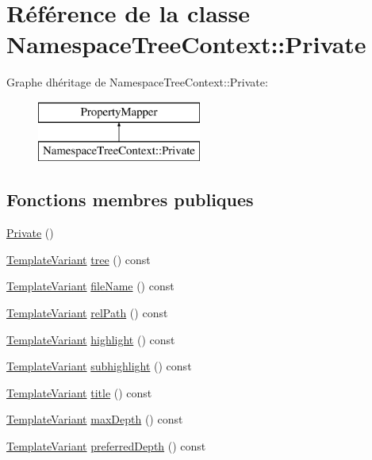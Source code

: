\hypertarget{class_namespace_tree_context_1_1_private}{}\section{Référence de la classe Namespace\+Tree\+Context\+:\+:Private}
\label{class_namespace_tree_context_1_1_private}
Graphe d\textquotesingle{}héritage de Namespace\+Tree\+Context\+:\+:Private\+:\begin{figure}[H]
\begin{center}
\leavevmode
\includegraphics[height=2.000000cm]{class_namespace_tree_context_1_1_private}
\end{center}
\end{figure}
\subsection*{Fonctions membres publiques}
\begin{DoxyCompactItemize}
\item 
\hyperlink{class_namespace_tree_context_1_1_private_a17c907538428027aecb1a6efb8861c82}{Private} ()
\item 
\hyperlink{class_template_variant}{Template\+Variant} \hyperlink{class_namespace_tree_context_1_1_private_ab68e28228197817c0f96b6647ef9964e}{tree} () const 
\item 
\hyperlink{class_template_variant}{Template\+Variant} \hyperlink{class_namespace_tree_context_1_1_private_af8fb6a15316cab1d93492666edc9abd3}{file\+Name} () const 
\item 
\hyperlink{class_template_variant}{Template\+Variant} \hyperlink{class_namespace_tree_context_1_1_private_ae7b67e21773f3cfd06e8cf561d4edfbb}{rel\+Path} () const 
\item 
\hyperlink{class_template_variant}{Template\+Variant} \hyperlink{class_namespace_tree_context_1_1_private_a8006f96dd57d480cd32b3d9a4edc8a45}{highlight} () const 
\item 
\hyperlink{class_template_variant}{Template\+Variant} \hyperlink{class_namespace_tree_context_1_1_private_a95dc7ff4b27577a7f59d4192d822b93f}{subhighlight} () const 
\item 
\hyperlink{class_template_variant}{Template\+Variant} \hyperlink{class_namespace_tree_context_1_1_private_a8b39708caa53acb154f0c3c93057e08b}{title} () const 
\item 
\hyperlink{class_template_variant}{Template\+Variant} \hyperlink{class_namespace_tree_context_1_1_private_a144acb7ba7d20dc06377980c96864b81}{max\+Depth} () const 
\item 
\hyperlink{class_template_variant}{Template\+Variant} \hyperlink{class_namespace_tree_context_1_1_private_a64f35a66711270d12e329d35dab1ba63}{preferred\+Depth} () const 
\end{DoxyCompactItemize}


